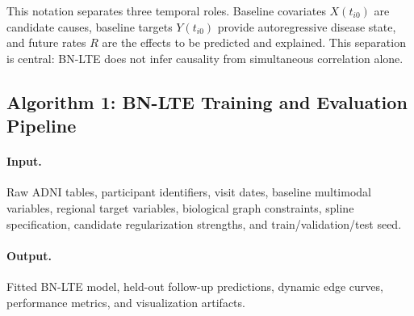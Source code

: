 This notation separates three temporal roles. Baseline covariates $X(t_{i0})$
are candidate causes, baseline targets $Y(t_{i0})$ provide autoregressive
disease state, and future rates $R$ are the effects to be predicted and
explained. This separation is central: BN-LTE does not infer causality from
simultaneous correlation alone.

\subsection{Algorithm 1: BN-LTE Training and Evaluation Pipeline}

\paragraph{Input.}
Raw ADNI tables, participant identifiers, visit dates, baseline multimodal
variables, regional target variables, biological graph constraints, spline
specification, candidate regularization strengths, and train/validation/test
seed.

\paragraph{Output.}
Fitted BN-LTE model, held-out follow-up predictions, dynamic edge curves,
performance metrics, and visualization artifacts.

